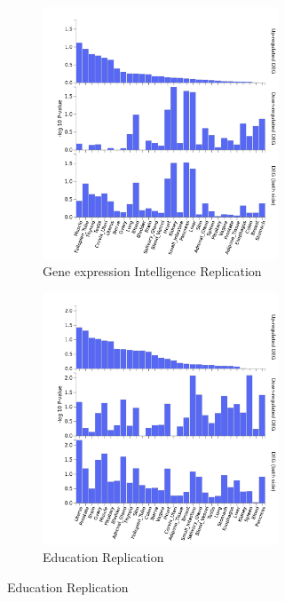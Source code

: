 

 \begin{figure}
  \begin{subfigure}{8cm}
    \centering\includegraphics[width=7cm]{images/FUMA_plots/deg_general_up/ctg_upreg_general_gtex_v8_ts_general_FUMA_gene2func44709.png}
    \caption{Gene expression Intelligence Replication}
    \end{subfigure}
  \begin{subfigure}{8cm}
    \centering\includegraphics[width=7cm]{images/FUMA_plots/deg_general_up/ea2_corrected_upreg_general_gtex_v8_ts_general_FUMA_gene2func44667.png}
    \caption{Education Replication}
  \end{subfigure}
 

\end{figure}
